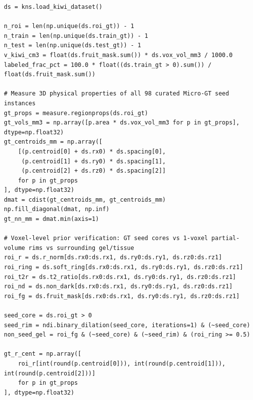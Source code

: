 \documentclass[10pt,a4paper]{article}
\renewcommand{\_}{\origunderscore\allowbreak}
\begin{document}
\begin{codebox}
\begin{lstlisting}[style=pybmed]
ds = kns.load_kiwi_dataset()

n_roi = len(np.unique(ds.roi_gt)) - 1
n_train = len(np.unique(ds.train_gt)) - 1
n_test = len(np.unique(ds.test_gt)) - 1
v_kiwi_cm3 = float(ds.fruit_mask.sum()) * ds.vox_vol_mm3 / 1000.0
labeled_frac_pct = 100.0 * float((ds.train_gt > 0).sum()) / float(ds.fruit_mask.sum())

# Measure 3D physical properties of all 98 curated Micro-GT seed instances
gt_props = measure.regionprops(ds.roi_gt)
gt_vols_mm3 = np.array([p.area * ds.vox_vol_mm3 for p in gt_props], dtype=np.float32)
gt_centroids_mm = np.array([
    [(p.centroid[0] + ds.rx0) * ds.spacing[0],
     (p.centroid[1] + ds.ry0) * ds.spacing[1],
     (p.centroid[2] + ds.rz0) * ds.spacing[2]]
    for p in gt_props
], dtype=np.float32)
dmat = cdist(gt_centroids_mm, gt_centroids_mm)
np.fill_diagonal(dmat, np.inf)
gt_nn_mm = dmat.min(axis=1)

# Voxel-level prior verification: GT seed cores vs 1-voxel partial-volume rims vs surrounding gel/tissue
roi_r = ds.r_norm[ds.rx0:ds.rx1, ds.ry0:ds.ry1, ds.rz0:ds.rz1]
roi_ring = ds.soft_ring[ds.rx0:ds.rx1, ds.ry0:ds.ry1, ds.rz0:ds.rz1]
roi_t2r = ds.t2_ratio[ds.rx0:ds.rx1, ds.ry0:ds.ry1, ds.rz0:ds.rz1]
roi_nd = ds.non_dark[ds.rx0:ds.rx1, ds.ry0:ds.ry1, ds.rz0:ds.rz1]
roi_fg = ds.fruit_mask[ds.rx0:ds.rx1, ds.ry0:ds.ry1, ds.rz0:ds.rz1]

seed_core = ds.roi_gt > 0
seed_rim = ndi.binary_dilation(seed_core, iterations=1) & (~seed_core)
non_seed_gel = roi_fg & (~seed_core) & (~seed_rim) & (roi_ring >= 0.5)

gt_r_cent = np.array([
    roi_r[int(round(p.centroid[0])), int(round(p.centroid[1])), int(round(p.centroid[2]))]
    for p in gt_props
], dtype=np.float32)


\end{lstlisting}
\end{codebox}
\end{document}
